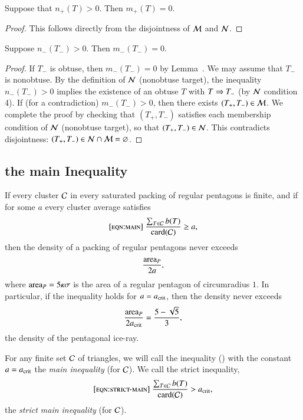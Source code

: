\begin{lemma}  
  Suppose that $n_+(T)>0$. Then $m_+(T)=0$.
\end{lemma}

\begin{proof} 
  This follows directly from the disjointness of $\mathcal M$ and $\mathcal N$.
\end{proof}

\begin{lemma}  
  Suppose $n_-(T_-)>0$.  Then $m_-(T_-)=0$.
\end{lemma}

\begin{proof}
  If $T_-$ is obtuse, then $m_-(T_-)=0$ by Lemma~.
  We may assume that $T_-$ is nonobtuse.  By the definition of $\mathcal N$
  (nonobtuse target), the inequality $n_-(T_-) >0$ implies the
  existence of an obtuse $T$ with $T\Rightarrow T_-$ (by $\mathcal N$ condition 4).
  If (for a contradiction) $m_-(T_-)>0$, then there exists
  $(T_+,T_-)\in\mathcal M$.  We complete the proof by checking that
  $(T_+,T_-)$ satisfies each membership condition of $\mathcal N$ (nonobtuse
  target), so that $(T_+,T_-)\in\mathcal N$.  This contradicts disjointness:
  $(T_+,T_-)\in \mathcal N\cap\mathcal M = \varnothing$.
\end{proof}



\subsection{the main Inequality}

\begin{lemma}  
If  every cluster $\mathcal C$ in every saturated packing of regular
  pentagons is finite, and if for some $a$ every cluster average
  satisfies
\begin{equation}\libel{eqn:main}
\frac{\sum_{T\in \C} b(T)}{\card(\C)} \ge a,
\end{equation}
then the density of a packing of regular pentagons never exceeds 
\[
\frac{{\operatorname{area}}_P} {2 a},
\]
where ${\operatorname{area}}_P = 5\kappa\sigma$ is the area of a regular pentagon of
circumradius $1$.  In particular, if the inequality holds for
$a=a_\text{crit}$, then the density never exceeds
\[
\frac{{\operatorname{area}}_P}{2 a_\text{crit}} = \frac{5 - \sqrt{5}}{3},
\] %
the density of the pentagonal ice-ray.
\end{lemma}

For any finite set $\mathcal C$ of triangles, we will call the inequality
() with the constant $a=a_\text{crit}$ the {\it main inequality}
(for $\mathcal C$).  We call the strict inequality,
\begin{equation}\libel{eqn:strict-main}
\frac{\sum_{T\in \C} b(T)}{\card(\C)} > \acrit,
\end{equation}
the {\it strict main inequality} (for $\mathcal C$).


